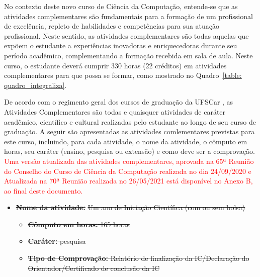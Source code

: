 

No contexto deste novo curso de Ciência da Computação, entende-se que as atividades complementares são fundamentais para a formação de um profissional de excelência, repleto de habilidades e competências para sua atuação profissional. Neste sentido, as atividades complementares são todas aquelas que expõem o estudante a experiências inovadoras e enriquecedoras durante seu período acadêmico, complementando a formação recebida em sala de aula. Neste curso, o estudante deverá cumprir 330 horas (22 créditos) em atividades complementares para que possa se formar, como mostrado no Quadro~\ref{table: quadro_integraliza}.

De acordo com o regimento geral dos cursos de graduação da UFSCar \cite{Regimento-Geral-CursosGraduacao-UFSCar}, as Atividades Complementares são todas e quaisquer atividades de caráter acadêmico, científico e cultural realizadas pelo estudante ao longo de seu curso de graduação. A seguir são apresentadas as atividades comlementares previstas para este curso, incluindo, para cada atividade, o nome da atividade, o cômputo em horas, seu caráter (ensino, pesquisa ou extensão) e como deve ser a comprovação. \textcolor{red}{Uma versão atualizada das atividades complementares, aprovada na 65ª Reunião do Conselho do Curso de Ciência da Computação realizada no dia 24/09/2020 e Atualizada na 70ª Reunião realizada no 26/05/2021 está disponível no Anexo B, ao final deste documento.}



\begin{itemize}
\item {\bf \sout{Nome da atividade:}}  \sout{Um ano de Iniciação Científica (com ou sem bolsa)}
\begin{itemize}
\item  \sout{{\bf  Cômputo em horas:} 165 horas}
\item  \sout{{\bf Caráter:} pesquisa}
\item  \sout{{\bf Tipo de Comprovação:} Relatório de finalização da IC/Declaração do Orientador/Certificado de conclusão da IC}
\end{itemize}
\end{itemize}

